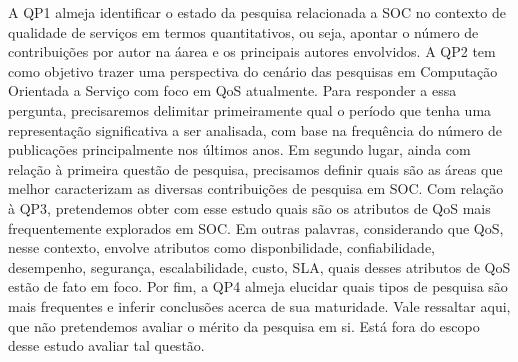 A QP1 almeja identificar o estado da pesquisa relacionada a SOC no contexto de qualidade de servi\c{c}os em termos quantitativos, ou seja, apontar o n\'{u}mero de contribui\c{c}\~{o}es por autor na \'{a}area e os principais autores envolvidos. A QP2 tem como objetivo trazer uma perspectiva do cen\'{a}rio das pesquisas em Computa\c{c}\~{a}o Orientada a Servi\c{c}o com foco em QoS atualmente. Para responder a essa pergunta, precisaremos delimitar primeiramente qual o per\'{i}odo que tenha uma representa\c{c}\~{a}o significativa a ser analisada, com base na frequ\^{e}ncia do n\'{u}mero de publica\c{c}\~{o}es principalmente nos \'{u}ltimos anos. Em segundo lugar, ainda com rela\c{c}\~{a}o \`{a} primeira quest\~{a}o de pesquisa, precisamos definir quais s\~{a}o as \'{a}reas que melhor caracterizam as diversas contribui\c{c}\~{o}es de pesquisa em SOC. Com rela\c{c}\~{a}o \`{a} QP3, pretendemos obter com esse estudo quais s\~{a}o os atributos de QoS mais frequentemente explorados em SOC. Em outras palavras, considerando que QoS, nesse contexto, envolve atributos como disponbilidade, confiabilidade, desempenho, seguran\c{c}a, escalabilidade, custo, SLA, quais desses atributos de QoS est\~{a}o de fato em foco. Por fim, a QP4 almeja elucidar quais tipos de pesquisa s\~{a}o mais frequentes e inferir conclusões acerca de sua maturidade. Vale ressaltar aqui, que n\~{a}o pretendemos avaliar o m\'{e}rito da pesquisa em si. Est\'{a} fora do escopo desse estudo avaliar tal quest\~{a}o.


